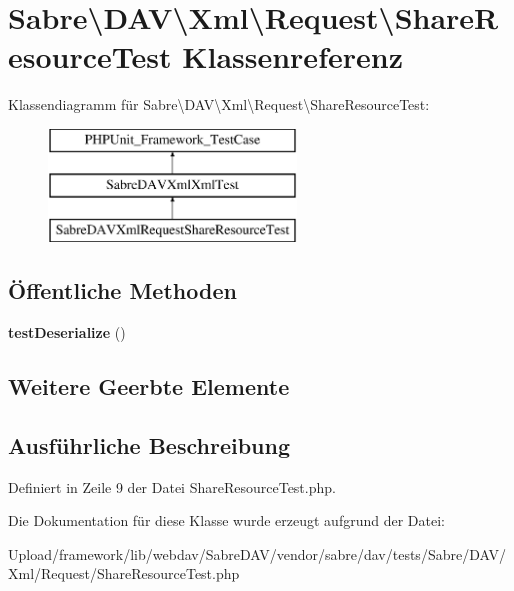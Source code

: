\hypertarget{class_sabre_1_1_d_a_v_1_1_xml_1_1_request_1_1_share_resource_test}{}\section{Sabre\textbackslash{}D\+AV\textbackslash{}Xml\textbackslash{}Request\textbackslash{}Share\+Resource\+Test Klassenreferenz}
\label{class_sabre_1_1_d_a_v_1_1_xml_1_1_request_1_1_share_resource_test}
Klassendiagramm für Sabre\textbackslash{}D\+AV\textbackslash{}Xml\textbackslash{}Request\textbackslash{}Share\+Resource\+Test\+:\begin{figure}[H]
\begin{center}
\leavevmode
\includegraphics[height=3.000000cm]{class_sabre_1_1_d_a_v_1_1_xml_1_1_request_1_1_share_resource_test}
\end{center}
\end{figure}
\subsection*{Öffentliche Methoden}
\begin{DoxyCompactItemize}
\item 
\mbox{\label{class_sabre_1_1_d_a_v_1_1_xml_1_1_request_1_1_share_resource_test_afe2ed137aa70381920137c0a4620941a}} 
{\bfseries test\+Deserialize} ()
\end{DoxyCompactItemize}
\subsection*{Weitere Geerbte Elemente}


\subsection{Ausführliche Beschreibung}


Definiert in Zeile 9 der Datei Share\+Resource\+Test.\+php.



Die Dokumentation für diese Klasse wurde erzeugt aufgrund der Datei\+:\begin{DoxyCompactItemize}
\item 
Upload/framework/lib/webdav/\+Sabre\+D\+A\+V/vendor/sabre/dav/tests/\+Sabre/\+D\+A\+V/\+Xml/\+Request/Share\+Resource\+Test.\+php\end{DoxyCompactItemize}
